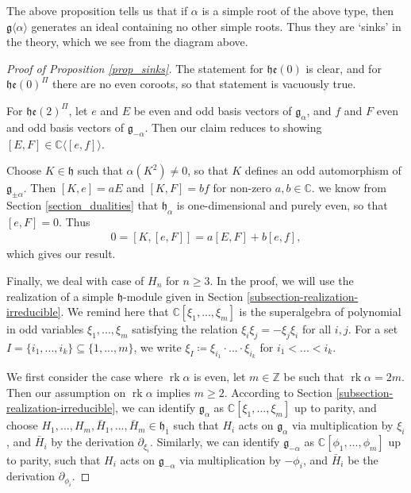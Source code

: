 \documentclass[12pt, a4paper, reqno]{amsart}
\def\e{\mathfrak{e}}
\def\g{\mathfrak{g}}
\def\h{\mathfrak{h}}
\def\ol{\overline}
\def\rk{\operatorname{rk}}
\theoremstyle{definition}
\theoremstyle{definition}
\theoremstyle{definition}
\numberwithin{theorem}{section}
\numberwithin{lemma}{section}
\numberwithin{remark}{section}
\numberwithin{definition}{section}
\numberwithin{corollary}{section}
\numberwithin{proposition}{section}
\numberwithin{example}{section}
\begin{document}
	The above proposition tells us that if $\alpha$ is a simple root of the above type, then $\g\langle\alpha\rangle$ generates an ideal containing no other simple roots. Thus they are `sinks' in the theory, which we see from the diagram above. 
	
	\begin{proof}[Proof of Proposition \ref{prop_sinks}]
		The statement for $\h\e(0)$ is clear, and for $\h\e(0)^{\Pi}$ there are no even coroots, so that statement is vacuously true.
		
		For $\h\e(2)^{\Pi}$, let \(e\) and \(E\) be even and odd basis vectors of \(\mathfrak{g}_{\alpha}\), and \(f\) and \(F\) even and odd basis vectors of \(\mathfrak{g}_{-\alpha}\). Then our claim reduces to showing \([E,F] \in \mathbb{C}\langle[e,f]\rangle\). 
		
		Choose $K\in\h$ such that $\alpha(K^2)\neq0$, so that $K$ defines an odd automorphism of $\g_{\pm\alpha}$.  Then \([K,e] = aE\) and \([K,F] = bf\) for non-zero \(a,b \in \mathbb{C}\). we know from Section \ref{section_dualities} that $\h_{\alpha}$ is one-dimensional and purely even, so that $[e,F]=0$.  Thus
		\begin{align*}
			0 = [K,[e,F]] = a[E,F] + b[e,f],
		\end{align*} 
		which gives our result.
		
		Finally, we deal with case of $H_n$ for $n\geq 3$.   In the proof, we will use the realization of a simple \(\mathfrak{h}\)-module given in Section \ref{subsection-realization-irreducible}. We remind here that \(\mathbb{C}[\xi_1,...,\xi_m]\) is the superalgebra of polynomial in odd variables \(\xi_1,...,\xi_m\) satisfying the relation \(\xi_i\xi_j = -\xi_j\xi_i\) for all \(i,j\). For a set \(I=\{i_1,...,i_k\} \subseteq \{1,...,m\}\), we write \(\xi_I \coloneq \xi_{i_1}\cdot...\cdot \xi_{i_k}\) for \(i_1<...<i_k\). 
		
		We first consider the case where \(\rk\alpha\) is even, let \(m \in \mathbb{Z}\) be such that \(\rk\alpha = 2m\). Then our assumption on \(\rk\alpha\) implies \(m \geq 2\). According to Section \ref{subsection-realization-irreducible}, we can identify \(\mathfrak{g}_{\alpha}\) as \(\mathbb{C}[\xi_1,...,\xi_m]\) up to parity, and choose \(H_1,...,H_m,\bar{H}_1,...,\bar{H}_m \in \mathfrak{h}_{\ol{1}}\) such that \(H_i\) acts on \(\mathfrak{g}_{\alpha}\) via multiplication by \(\xi_i\), and \(\bar{H}_i\) by the derivation \(\partial_{\xi_i}\). Similarly, we can identify \(\mathfrak{g}_{-\alpha}\) as \(\mathbb{C}[\phi_1,...,\phi_m]\) up to parity, such that \(H_i\) acts on \(\mathfrak{g}_{-\alpha}\) via multiplication by \(-\phi_i\), and \(\bar{H}_i\) be the derivation \(\partial_{\phi_i}\). 
		

\end{proof}
\end{document}
